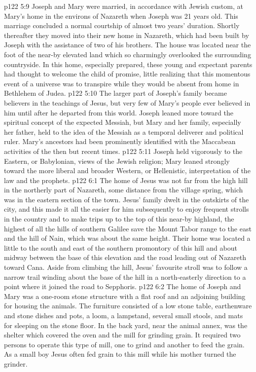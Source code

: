 \vs p122 5:9 Joseph and Mary were married, in accordance with Jewish custom, at Mary’s home in the environs of Nazareth when Joseph was 21 years old. This marriage concluded a normal courtship of almost two years’ duration. Shortly thereafter they moved into their new home in Nazareth, which had been built by Joseph with the assistance of two of his brothers. The house was located near the foot of the near\hyp{}by elevated land which so charmingly overlooked the surrounding countryside. In this home, especially prepared, these young and expectant parents had thought to welcome the child of promise, little realizing that this momentous event of a universe was to transpire while they would be absent from home in Bethlehem of Judea.
\vs p122 5:10 \pc The larger part of Joseph’s family became believers in the teachings of Jesus, but very few of Mary’s people ever believed in him until after he departed from this world. Joseph leaned more toward the spiritual concept of the expected Messiah, but Mary and her family, especially her father, held to the idea of the Messiah as a temporal deliverer and political ruler. Mary’s ancestors had been prominently identified with the Maccabean activities of the then but recent times.
\vs p122 5:11 Joseph held vigorously to the Eastern, or Babylonian, views of the Jewish religion; Mary leaned strongly toward the more liberal and broader Western, or Hellenistic, interpretation of the law and the prophets.
\vs p122 6:1 The home of Jesus was not far from the high hill in the northerly part of Nazareth, some distance from the village spring, which was in the eastern section of the town. Jesus’ family dwelt in the outskirts of the city, and this made it all the easier for him subsequently to enjoy frequent strolls in the country and to make trips up to the top of this near\hyp{}by highland, the highest of all the hills of southern Galilee save the Mount Tabor range to the east and the hill of Nain, which was about the same height. Their home was located a little to the south and east of the southern promontory of this hill and about midway between the base of this elevation and the road leading out of Nazareth toward Cana. Aside from climbing the hill, Jesus’ favourite stroll was to follow a narrow trail winding about the base of the hill in a north\hyp{}easterly direction to a point where it joined the road to Sepphoris.
\vs p122 6:2 The home of Joseph and Mary was a one\hyp{}room stone structure with a flat roof and an adjoining building for housing the animals. The furniture consisted of a low stone table, earthenware and stone dishes and pots, a loom, a lampstand, several small stools, and mats for sleeping on the stone floor. In the back yard, near the animal annex, was the shelter which covered the oven and the mill for grinding grain. It required two persons to operate this type of mill, one to grind and another to feed the grain. As a small boy Jesus often fed grain to this mill while his mother turned the grinder.
